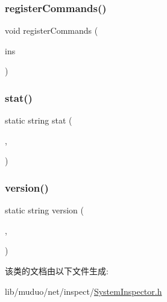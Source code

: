 \subsubsection{\texorpdfstring{register\+Commands()}{registerCommands()}}
{\footnotesize\ttfamily void register\+Commands (\begin{DoxyParamCaption}\item[{\hyperlink{classmuduo_1_1net_1_1Inspector}{Inspector} $\ast$}]{ins }\end{DoxyParamCaption})}

\mbox{\label{classmuduo_1_1net_1_1SystemInspector_af0ab0448a3f1b08257900f1a0df80fce}} 
\subsubsection{\texorpdfstring{stat()}{stat()}}
{\footnotesize\ttfamily static string stat (\begin{DoxyParamCaption}\item[{\hyperlink{classmuduo_1_1net_1_1HttpRequest_a2a3c0067e44c5ef3210a256d06c16b0f}{Http\+Request\+::\+Method}}]{,  }\item[{const \hyperlink{classmuduo_1_1net_1_1Inspector_aa22799cd3b4f56688d431d68c2d014a0}{Inspector\+::\+Arg\+List} \&}]{ }\end{DoxyParamCaption})\hspace{0.3cm}{\ttfamily [static]}}

\mbox{\label{classmuduo_1_1net_1_1SystemInspector_a86619e1e0a9567f11ced75514da7543f}} 
\subsubsection{\texorpdfstring{version()}{version()}}
{\footnotesize\ttfamily static string version (\begin{DoxyParamCaption}\item[{\hyperlink{classmuduo_1_1net_1_1HttpRequest_a2a3c0067e44c5ef3210a256d06c16b0f}{Http\+Request\+::\+Method}}]{,  }\item[{const \hyperlink{classmuduo_1_1net_1_1Inspector_aa22799cd3b4f56688d431d68c2d014a0}{Inspector\+::\+Arg\+List} \&}]{ }\end{DoxyParamCaption})\hspace{0.3cm}{\ttfamily [static]}}



该类的文档由以下文件生成\+:\begin{DoxyCompactItemize}
\item 
lib/muduo/net/inspect/\hyperlink{SystemInspector_8h}{System\+Inspector.\+h}\end{DoxyCompactItemize}
